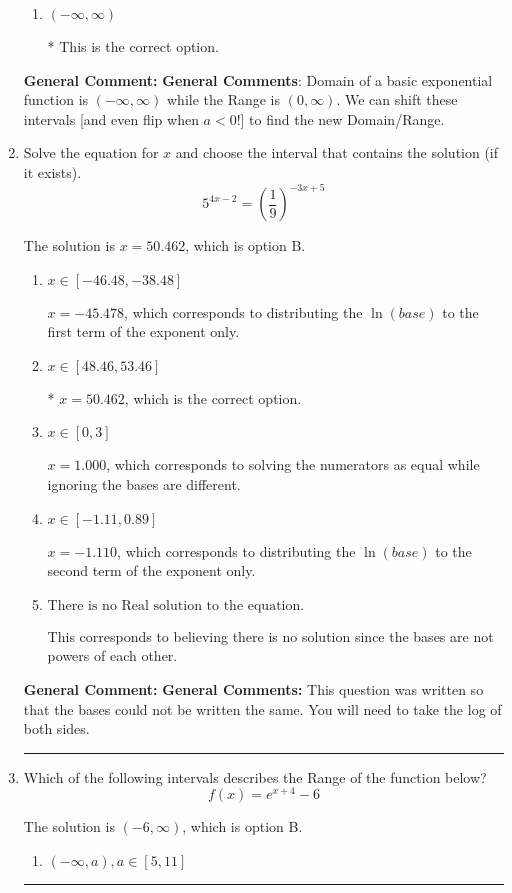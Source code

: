 \documentclass{extbook}[14pt]
\newcommand{\litem}[1]{\item #1

\rule{\textwidth}{0.4pt}}
\begin{document}
\begin{enumerate}
{\begin{enumerate}[label=\Alph*.]
$(-\infty, 9]$, which corresponds to using the correct vertical shift *if we wanted the Range* AND including the endpoint.
\item \( (-\infty, \infty) \)

* This is the correct option.
\end{enumerate}

\textbf{General Comment:} \textbf{General Comments}: Domain of a basic exponential function is $(-\infty, \infty)$ while the Range is $(0, \infty)$. We can shift these intervals [and even flip when $a<0$!] to find the new Domain/Range.
}
\litem{
Solve the equation for $x$ and choose the interval that contains the solution (if it exists).
\[ 5^{4x-2} = \left(\frac{1}{9}\right)^{-3x+5} \]

The solution is \( x = 50.462 \), which is option B.\begin{enumerate}[label=\Alph*.]
\item \( x \in [-46.48, -38.48] \)

$x = -45.478$, which corresponds to distributing the $\ln(base)$ to the first term of the exponent only.
\item \( x \in [48.46, 53.46] \)

* $x = 50.462$, which is the correct option.
\item \( x \in [0, 3] \)

$x = 1.000$, which corresponds to solving the numerators as equal while ignoring the bases are different.
\item \( x \in [-1.11, 0.89] \)

$x = -1.110$, which corresponds to distributing the $\ln(base)$ to the second term of the exponent only.
\item \( \text{There is no Real solution to the equation.} \)

This corresponds to believing there is no solution since the bases are not powers of each other.
\end{enumerate}

\textbf{General Comment:} \textbf{General Comments:} This question was written so that the bases could not be written the same. You will need to take the log of both sides.
}
\litem{
Which of the following intervals describes the Range of the function below?
\[ f(x) = e^{x+4}-6 \]

The solution is \( (-6, \infty) \), which is option B.\begin{enumerate}[label=\Alph*.]
\item \( (-\infty, a), a \in [5, 11] \)


\end{enumerate}}
\end{enumerate}
\end{document}

